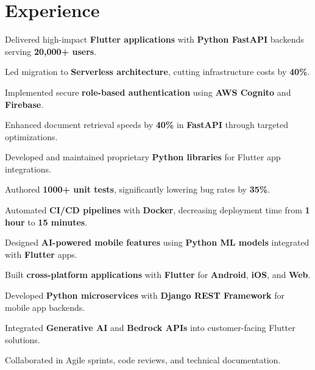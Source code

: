 \documentclass[]{deedy-resume-reversed}
\begin{document}
\begin{minipage}[t]{0.60\textwidth}

\section{Experience}

\vspace{\topsep}
\begin{tightemize}
\item Delivered high-impact \textbf{Flutter applications} with \textbf{Python FastAPI} backends serving \textbf{20,000+ users}.
\item Led migration to \textbf{Serverless architecture}, cutting infrastructure costs by \textbf{40\%}.
\item Implemented secure \textbf{role-based authentication} using \textbf{AWS Cognito} and \textbf{Firebase}.
\item Enhanced document retrieval speeds by \textbf{40\%} in \textbf{FastAPI} through targeted optimizations.
\item Developed and maintained proprietary \textbf{Python libraries} for Flutter app integrations.
\item Authored \textbf{1000+ unit tests}, significantly lowering bug rates by \textbf{35\%}.
\item Automated \textbf{CI/CD pipelines} with \textbf{Docker}, decreasing deployment time from \textbf{1 hour} to \textbf{15 minutes}.
\end{tightemize}

\begin{tightemize}
\item Designed \textbf{AI-powered mobile features} using \textbf{Python ML models} integrated with \textbf{Flutter} apps.
\item Built \textbf{cross-platform applications} with \textbf{Flutter} for \textbf{Android}, \textbf{iOS}, and \textbf{Web}.
\item Developed \textbf{Python microservices} with \textbf{Django REST Framework} for mobile app backends.
\item Integrated \textbf{Generative AI} and \textbf{Bedrock APIs} into customer-facing Flutter solutions.
\item Collaborated in Agile sprints, code reviews, and technical documentation.
\end{tightemize}
\sectionsep


\end{minipage}
\end{document}

